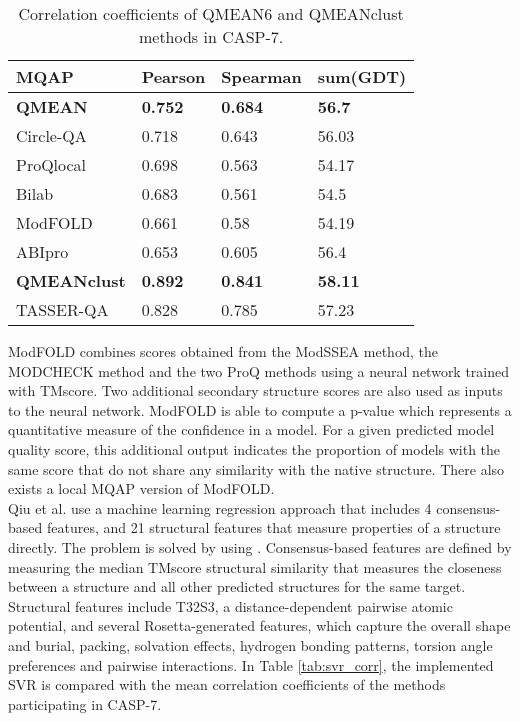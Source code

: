 \begin{table}[tb]
\center
\begin{tabular}{llll}
\toprule                %
\textbf{MQAP} & \textbf{Pearson} & \textbf{Spearman} & \textbf{sum(GDT)} \\
\midrule                %
	\textbf{QMEAN}	&\textbf{0.752}	&\textbf{0.684}	&\textbf{56.7}\\
	Circle-QA	&0.718	&0.643	&56.03\\
	ProQlocal	&0.698	&0.563	&54.17\\
	Bilab		&0.683	&0.561	&54.5\\
	ModFOLD		&0.661	&0.58	&54.19\\
	ABIpro		&0.653	&0.605	&56.4\\
	\textbf{QMEANclust}	&\textbf{0.892}	&\textbf{0.841}	&\textbf{58.11}\\
	TASSER-QA	&0.828	&0.785	&57.23\\
\bottomrule               %
\end{tabular}
\caption[Correlation coefficients of QMEAN6 and QMEANclust methods in CASP-7]{Correlation coefficients of QMEAN6 and QMEANclust methods in CASP-7.}
\label{tab:qmean6_corr}
\end{table}
ModFOLD \cite{McGuffin2007aa, McGuffin2008} combines scores obtained from the ModSSEA method, the MODCHECK method and the two ProQ methods using a neural network trained with TMscore. Two additional secondary structure scores are also used as inputs to the neural network. ModFOLD is able to compute a p-value which represents a quantitative measure of the confidence in a model. For a given predicted model quality score, this additional output indicates the proportion of models with the same score that do not share any similarity with the native structure. There also exists a local MQAP version of ModFOLD.\\
Qiu et al.\cite{Qiu2008} use a machine learning regression approach that includes 4 consensus-based features, and 21 structural features that measure properties of a structure directly. The problem is solved by using . Consensus-based features are defined by measuring the median TMscore structural similarity that measures the closeness between a structure and all other predicted structures for the same target. Structural features include T32S3, a distance-dependent pairwise atomic potential, and several Rosetta-generated features, which capture the overall shape and burial, packing, solvation effects, hydrogen bonding patterns, torsion angle preferences and pairwise interactions. In Table \ref{tab:svr_corr}, the implemented SVR is compared with the mean correlation coefficients of the methods participating in CASP-7.

